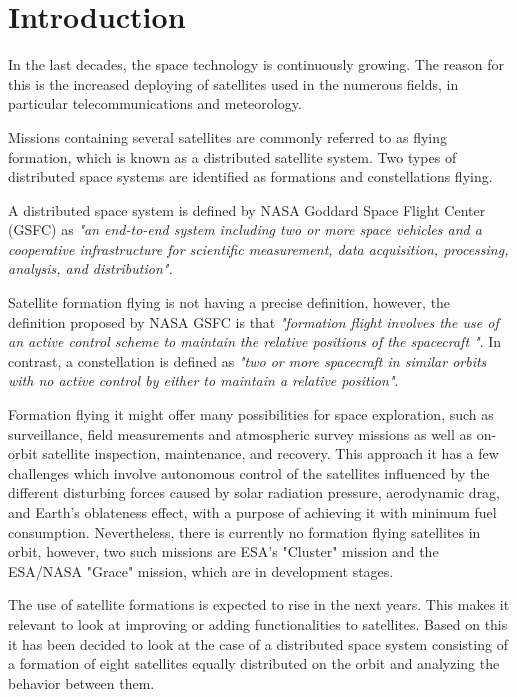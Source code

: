 \chapter{Introduction}\label{chap:Introduction}
In the last decades, the space technology is continuously growing. The reason for this is the increased deploying of satellites used in the numerous fields, in particular telecommunications and meteorology.  \cite{SIDI}

Missions containing several satellites are commonly referred to as flying formation, which is known as a distributed satellite system. Two types of distributed space systems are identified as formations and constellations flying. 

A distributed space system is defined by NASA Goddard Space Flight Center (GSFC) as \textit{"an end-to-end system including two or more space vehicles and a cooperative infrastructure for scientific measurement, data acquisition, processing, analysis, and distribution".} \cite{SFF}

Satellite formation flying is not having a precise definition, however, the definition proposed by NASA GSFC is that \textit{"formation flight involves the use of an active control scheme to maintain the relative positions of the spacecraft "}. In contrast, a constellation is defined as \textit{"two or more spacecraft in similar orbits with no active control by either to maintain a relative position"}. \cite{SF}

Formation flying it might offer many possibilities for space exploration, such as surveillance, field measurements and atmospheric survey missions as well as on-orbit satellite inspection, maintenance, and recovery. This approach it has a few challenges which involve autonomous control of the satellites influenced by the different disturbing forces caused by solar radiation pressure, aerodynamic drag, and Earth’s oblateness effect, with a purpose of achieving it with minimum fuel consumption. Nevertheless, there is currently no formation flying satellites in orbit, however, two such missions are ESA’s "Cluster" mission and the ESA/NASA "Grace" mission, which are in development stages. \cite{SF}

The use of satellite formations is expected to rise in the next years. This makes it relevant to look at improving or adding functionalities to satellites. Based on this it has been decided to look at the case of a distributed space system consisting of a formation of eight satellites equally distributed on the orbit and analyzing the behavior between them.
 \vspace{2cm}
